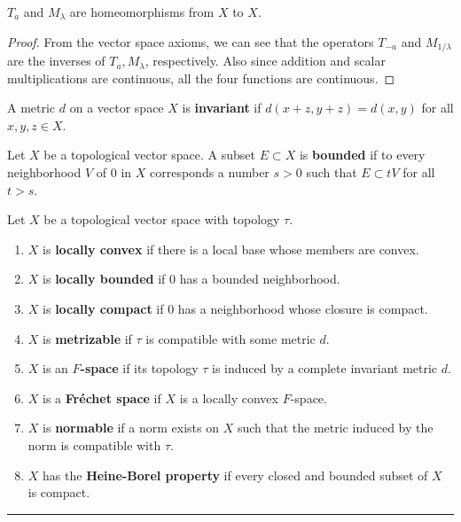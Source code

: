 \begin{prop} $T_a$ and $M_\lambda$ are homeomorphisms from $X$ to $X$.
\end{prop}
\begin{proof}
From the vector space axioms, we can see that the operators $T_{-a}$ and $M_{1/\lambda}$ are the inverses of $T_a, M_\lambda$, respectively. Also since addition and scalar multiplications are continuous, all the four functions are continuous.
\end{proof}

\begin{defn} A metric $d$ on a vector space $X$ is \textbf{invariant} if $d(x+z,y+z)=d(x,y)$ for all $x,y,z \in X$.
\end{defn}

\begin{defn} Let $X$ be a topological vector space. A subset $E\subset X$ is \textbf{bounded} if to every neighborhood $V$ of $0$ in $X$ corresponds a number $s>0$ such that $E\subset tV$ for all $t>s$.
\end{defn}

\begin{defn} Let $X$ be a topological vector space with topology $\tau$.
\begin{enumerate}
\item $X$ is \textbf{locally convex} if there is a local base whose members are convex.
\item $X$ is \textbf{locally bounded} if $0$ has a bounded neighborhood.
\item $X$ is \textbf{locally compact} if $0$ has a neighborhood whose closure is compact.
\item $X$ is \textbf{metrizable} if $\tau$ is compatible with some metric $d$.
\item $X$ is an \textbf{$F$-space} if its topology $\tau$ is induced by a complete invariant metric $d$.
\item $X$ is a \textbf{Fr{\'e}chet space} if $X$ is a locally convex $F$-space.
\item $X$ is \textbf{normable} if a norm exists on $X$ such that the metric induced by the norm is compatible with $\tau$.
\item $X$ has the \textbf{Heine-Borel property} if every closed and bounded subset of $X$ is compact.
\end{enumerate}
\end{defn}
\noindent\rule{\textwidth}{1pt}
\newline
